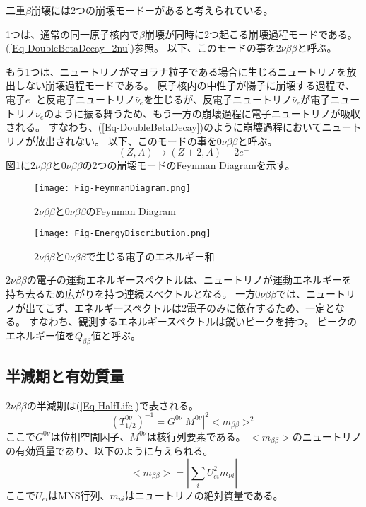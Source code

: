 \documentclass[a4paper,10pt]{jreport}
\begin{document}
二重$\beta$崩壊には2つの崩壊モードーがあると考えられている。

1つは、通常の同一原子核内で$\beta$崩壊が同時に2つ起こる崩壊過程モードである。
(\ref{Eq-DoubleBetaDecay_2nu})参照。
以下、このモードの事を$2\nu\beta\beta$と呼ぶ。

もう1つは、ニュートリノがマヨラナ粒子である場合に生じるニュートリノを放出しない崩壊過程モードである。
原子核内の中性子が陽子に崩壊する過程で、電子$e^-$と反電子ニュートリノ$\bar{\nu}_e$を生じるが、反電子ニュートリノ$\bar{\nu}_e$が電子ニュートリノ$\nu_e$のように振る舞うため、もう一方の崩壊過程に電子ニュートリノが吸収される。
すなわち、(\ref{Eq-DoubleBetaDecay})のように崩壊過程においてニュートリノが放出されない。
以下、このモードの事を$0\nu\beta\beta$と呼ぶ。
\begin{equation} \label{Eq-DoubleBetaDecay}
	(Z,A)\to(Z+2,A)+2e^-
\end{equation}
図\ref{Fig-FeynmanDiagram}に$2\nu\beta\beta$と$0\nu\beta\beta$の2つの崩壊モードのFeynman Diagramを示す。

\begin{figure}[H]
	\center
	\texttt{[image: Fig-FeynmanDiagram.png]}
	\caption{$2\nu\beta\beta$と$0\nu\beta\beta$のFeynman Diagram} \label{Fig-FeynmanDiagram}
\end{figure}

\begin{figure}[H]
	\center
	\texttt{[image: Fig-EnergyDiscribution.png]}
	\caption{$2\nu\beta\beta$と$0\nu\beta\beta$で生じる電子のエネルギー和} \label{Fig-EnergyDiscribution}
\end{figure}

$2\nu\beta\beta$の電子の運動エネルギースペクトルは、ニュートリノが運動エネルギーを持ち去るため広がりを持つ連続スペクトルとなる。
一方$0\nu\beta\beta$では、ニュートリノが出てこず、エネルギースペクトルは2電子のみに依存するため、一定となる。
すなわち、観測するエネルギースペクトルは鋭いピークを持つ。
ピークのエネルギー値を$Q_{\beta\beta}$値と呼ぶ。



\subsection{半減期と有効質量}

$2\nu\beta\beta$の半減期は(\ref{Eq-HalfLife})で表される。
\begin{equation} \label{Eq-HalfLife}
	\left(T_{1/2}^{0\nu}\right)^{-1} = G^{0\nu}|M^{0\nu}|^2<m_{\beta\beta}>^2
\end{equation}
ここで$G^{0\nu}$は位相空間因子、$M^{0\nu}$は核行列要素である。
$<m_{\beta\beta}>$のニュートリノの有効質量であり、以下のように与えられる。
\begin{equation} \label{Eq-EffectiveMass}
	< m_{\beta\beta} > =|\sum_i U_{ei}^2m_{\nu i}|
\end{equation}
ここで$U_{ei}$はMNS行列、$m_{\nu i}$はニュートリノの絶対質量である。
\end{document}
